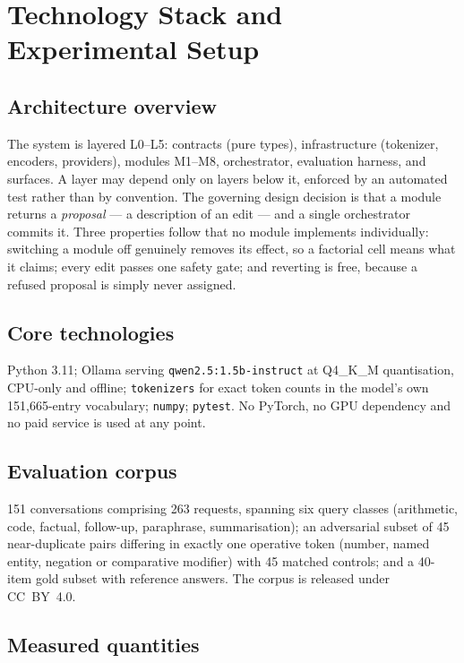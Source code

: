 \documentclass[11pt,a4paper]{article}
\begin{document}
\section{Technology Stack and Experimental Setup}
\label{sec:setup}

\subsection{Architecture overview}
The system is layered L0--L5: contracts (pure types), infrastructure (tokenizer,
encoders, providers), modules M1--M8, orchestrator, evaluation harness, and
surfaces. A layer may depend only on layers below it, enforced by an automated
test rather than by convention. The governing design decision is that a module
returns a \emph{proposal} --- a description of an edit --- and a single
orchestrator commits it. Three properties follow that no module implements
individually: switching a module off genuinely removes its effect, so a factorial
cell means what it claims; every edit passes one safety gate; and reverting is
free, because a refused proposal is simply never assigned.

\subsection{Core technologies}
Python 3.11; Ollama serving \texttt{qwen2.5:1.5b-instruct} at Q4\_K\_M
quantisation, CPU-only and offline; \texttt{tokenizers} for exact token counts in
the model's own 151{,}665-entry vocabulary; \texttt{numpy}; \texttt{pytest}. No
PyTorch, no GPU dependency and no paid service is used at any point.

\subsection{Evaluation corpus}
\label{sec:corpus}
151 conversations comprising 263 requests, spanning six query classes
(arithmetic, code, factual, follow-up, paraphrase, summarisation); an adversarial
subset of 45 near-duplicate pairs differing in exactly one operative token
(number, named entity, negation or comparative modifier) with 45 matched
controls; and a 40-item gold subset with reference answers. The corpus is
released under CC~BY~4.0.

\subsection{Measured quantities}
\label{sec:metrics}
\end{document}
